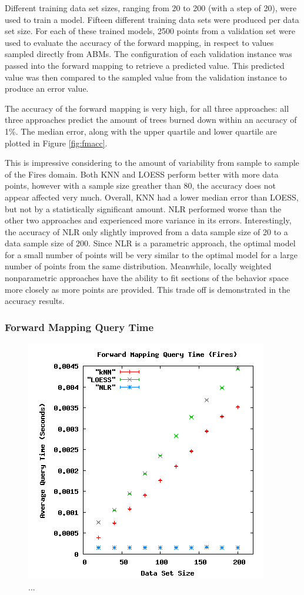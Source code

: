 Different training data set sizes, ranging from 20 to 200 (with a step of 20), were used to train a model.
Fifteen different training data sets were produced per data set size.
For each of these trained models, 2500 points from a validation set were used to evaluate the accuracy of the forward mapping, in respect to values sampled directly from ABMs.
The configuration of each validation instance was passed into the forward mapping to retrieve a predicted value.
This predicted value was then compared to the sampled value from the validation instance to produce an error value.

The accuracy of the forward mapping is very high, for all three approaches: all three approaches predict the amount of trees burned down within an accuracy of 1\%.
The median error, along with the upper quartile and lower quartile are plotted in Figure \ref{fig:fmacc}.

This is impressive considering to the amount of variability from sample to sample of the Fires domain.
Both KNN and LOESS perform better with more data points, however with a sample size greather than 80, the accuracy does not appear affected very much.
Overall, KNN had a lower median error than LOESS, but not by a statistically significant amount.
NLR performed worse than the other two approaches and experienced more variance in its errors.
Interestingly, the accuracy of NLR only slightly improved from a data sample size of 20 to a data sample size of 200.
Since NLR is a parametric approach, the optimal model for a small number of points will be very similar to the optimal model for a large number of points from the same distribution.
Meanwhile, locally weighted nonparametric approaches have the ability to fit sections of the behavior space more closely as more points are provided.
This trade off is demonstrated in the accuracy results.


\subsubsection{Forward Mapping Query Time}
\begin{figure}[ht]
\centering
\includegraphics[scale=.5]{images/results_fires/fmquery.png}
\caption{...}
\label{fig:firefmquery}
\end{figure}

